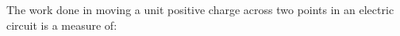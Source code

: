 The work done in moving a unit positive charge across two points 
in an electric circuit is a measure of: